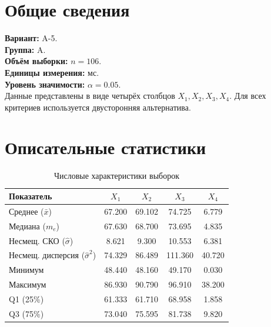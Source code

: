 \section{Общие сведения}

\textbf{Вариант:} A-5.\\
\textbf{Группа:} A.\\
\textbf{Объём выборки:} \(n = 106\).\\
\textbf{Единицы измерения:} мс.\\
\textbf{Уровень значимости:} \(\alpha = 0.05\).\\
Данные представлены в виде четырёх столбцов \(X_1, X_2, X_3, X_4\). Для всех критериев используется двусторонняя альтернатива.

\section{Описательные статистики}

\begin{table}[H]
\centering
\caption{Числовые характеристики выборок}
\label{tab:stats}
\begin{tabular}{lcccc}
\toprule
Показатель & \(X_1\) & \(X_2\) & \(X_3\) & \(X_4\) \\
\midrule
Среднее (\(\bar{x}\)) & 67.200 & 69.102 & 74.725 & 6.779 \\
Медиана (\(m_e\)) & 67.630 & 68.700 & 73.695 & 4.835 \\
Несмещ. СКО (\(\hat{\sigma}\)) & 8.621 & 9.300 & 10.553 & 6.381 \\
Несмещ. дисперсия (\(\hat{\sigma}^2\)) & 74.329 & 86.489 & 111.360 & 40.720 \\
Минимум & 48.440 & 48.160 & 49.170 & 0.030 \\
Максимум & 86.930 & 90.790 & 96.910 & 38.200 \\
Q1 (25\%) & 61.333 & 61.710 & 68.958 & 1.858 \\
Q3 (75\%) & 73.040 & 75.595 & 81.738 & 9.820 \\
\bottomrule
\end{tabular}
\end{table}
